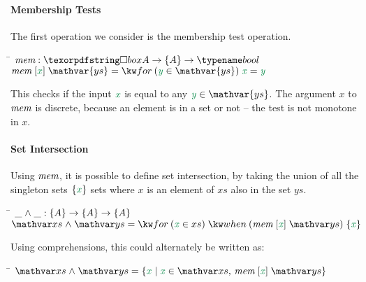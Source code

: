 \paragraph{Membership Tests} The first operation we consider is the
membership test operation.
\begin{tabbing}
  \qquad\=\+ \kill
  $\name{mem} : \iso A \to \tset A \to \tbool$ \\
  $\name{mem}\;\ebox{x} \; \mathvar{ys} = \efor{y}{\mathvar{ys}} \dvar x = \dvar y$
\end{tabbing}

\noindent
This checks if the input $\dvar x$ is equal to any $\dvar y \in \mathvar{ys}$.
The argument $x$ to $\text{\itshape mem}$ is discrete, because an element is in a set or
not -- the test is not monotone in $x$.

\paragraph{Set Intersection}
Using $\text{\itshape mem}$, it is possible to define set intersection, by taking the union of
all the singleton sets $\eset{x}$ sets where $x$ is an element of $xs$ also in the set $ys$.

\begin{tabbing}
  \qquad\=\+ \kill
  $\_ \wedge \_ : \tset A \to \tset A \to \tset A$ \\
  $\var{xs} \wedge \var{ys} = \efor{x}{xs}
  \ewhen{\name{mem}\;\eboxvar{x}\;\var{ys}}{\eset{\dvar x}}$
\end{tabbing}

\noindent
Using comprehensions, this could alternately be written as:
\begin{tabbing}
  \qquad\=\+ \kill
  $\var{xs} \wedge \var{ys} = \esetfor{x}{\dvar x \in \var{xs},\, \name{mem}\;\eboxvar{x}\;\var{ys}}$
\end{tabbing}

